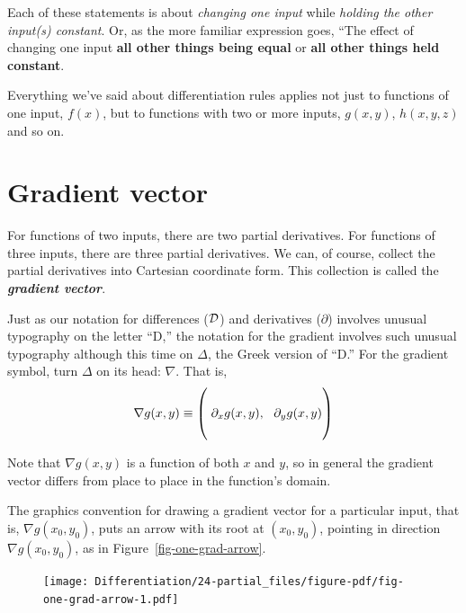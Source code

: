 \documentclass[
  letterpaper,
  DIV=11,
  numbers=noendperiod,
  oneside]{scrreprt}
\begin{document}
Each of these statements is about \emph{changing one input} while
\emph{holding the other input(s) constant}. Or, as the more familiar
expression goes, ``The effect of changing one input \textbf{all other
things being equal} or \textbf{all other things held
constant}.

Everything we've said about differentiation rules applies not just to
functions of one input, \(f(x)\), but to functions with two or more
inputs, \(g(x,y)\), \(h(x,y,z)\) and so on.

\hypertarget{gradient-vector}{%
\section{Gradient vector}\label{gradient-vector}}

For functions of two inputs, there are two partial derivatives. For
functions of three inputs, there are three partial derivatives. We can,
of course, collect the partial derivatives into Cartesian coordinate
form. This collection is called the \textbf{\emph{gradient vector}}.

Just as our notation for differences (\(\cal D\)) and derivatives
(\(\partial\)) involves unusual typography on the letter ``D,'' the
notation for the gradient involves such unusual typography although this
time on \(\Delta\), the Greek version of ``D.'' For the gradient symbol,
turn \(\Delta\) on its head: \(\nabla\). That is,
\[\nabla g(x,y) \equiv \left(\stackrel\strut\strut\partial_x g(x,y), \ \ \partial_y g(x,y)\right)\]

Note that \(\nabla g(x,y)\) is a function of both \(x\) and \(y\), so in
general the gradient vector differs from place to place in the
function's domain.

The graphics convention for drawing a gradient vector for a particular
input, that is, \(\nabla g(x_0, y_0)\), puts an arrow with its root at
\((x_0, y_0)\), pointing in direction \(\nabla g(x_0, y_0)\), as in
Figure~\ref{fig-one-grad-arrow}.

\begin{figure}


{\centering \texttt{[image: Differentiation/24-partial\_files/figure-pdf/fig-one-grad-arrow-1.pdf]}

}

\end{figure}
\end{document}
